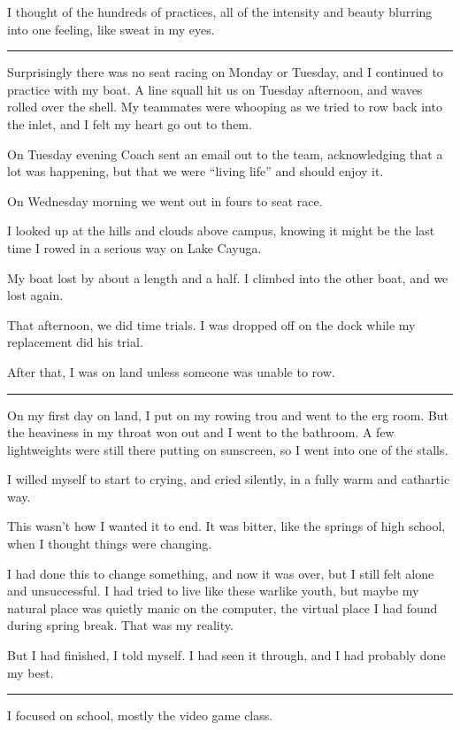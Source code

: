 I thought of the hundreds of practices, all of the intensity and beauty blurring
into one feeling, like sweat in my eyes.

\plainfancybreak{12pt}{2}{}

Surprisingly there was no seat racing on Monday or Tuesday, and I continued to
practice with my boat.  A line squall hit us on Tuesday afternoon, and waves
rolled over the shell.  My teammates were whooping as we tried to row back into
the inlet, and I felt my heart go out to them.

On Tuesday evening Coach sent an email out to the team, acknowledging that a lot
was happening, but that we were ``living life'' and should enjoy it.

On Wednesday morning we went out in fours to seat race.

I looked up at the hills and clouds above campus, knowing it might be the last
time I rowed in a serious way on Lake Cayuga.

My boat lost by about a length and a half.  I climbed into the other boat, and
we lost again.

That afternoon, we did time trials.  I was dropped off on the dock while my
replacement did his trial. 

After that, I was on land unless someone was unable to row.
 
\plainfancybreak{12pt}{2}{}

On my first day on land, I put on my rowing trou and went to the erg room.  But
the heaviness in my throat won out and I went to the bathroom.  A few
lightweights were still there putting on sunscreen, so I went into one of the
stalls.  

I willed myself to start to crying, and cried silently, in a fully warm and
cathartic way.  

This wasn't how I wanted it to end.  It was bitter, like the springs of high
school, when I thought things were changing.  

I had done this to change something, and now it was over, but I still felt alone
and unsuccessful.  I had tried to live like these warlike youth, but maybe my
natural place was quietly manic on the computer, the virtual place I had found
during spring break.  That was my reality.

But I had finished, I told myself.  I had seen it through, and I had probably
done my best.

\plainfancybreak{12pt}{2}{}

I focused on school, mostly the video game class.

